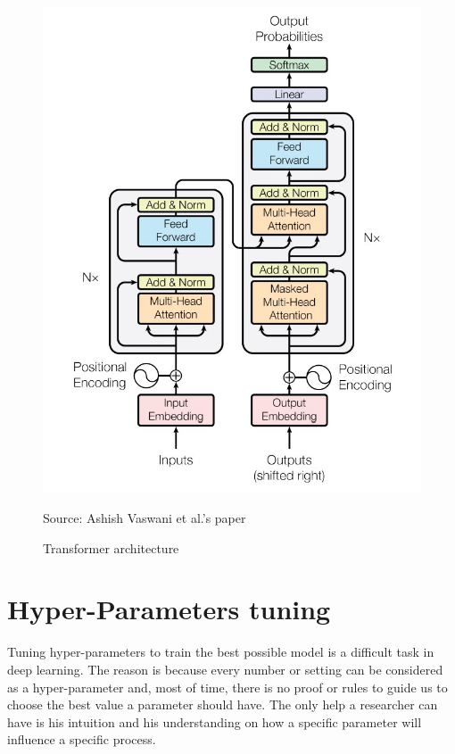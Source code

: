 \documentclass[12pt]{report}
\begin{document}
\begin{figure}[htbp]
    \centering
    \includegraphics[width=\textwidth]{images/related_works/transformer/transformer_architecture.jpg}
    \caption{Transformer architecture}
    Source: Ashish Vaswani et al.'s paper \cite{vaswani_attention_2017-1}
    \label{fig:arch:transformer}
\end{figure}

\section{Hyper-Parameters tuning}
\label{appendix:hp-tuning}

Tuning hyper-parameters to train the best possible model is a difficult task in deep learning.
The reason is because every number or setting can be considered as a hyper-parameter and, most of time, there is no proof or rules to guide us to choose the best value a parameter should have.
The only help a researcher can have is his intuition and his understanding on how a specific parameter will influence a specific process.
\end{document}
